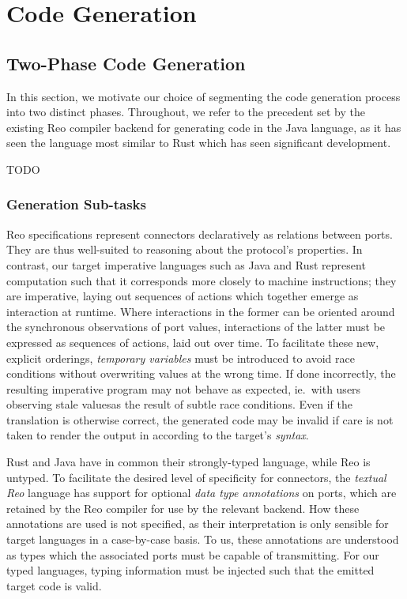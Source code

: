 \chapter{Code Generation}
\label{sec:imperative_form}







\section{Two-Phase Code Generation}
In this section, we motivate our choice of segmenting the code generation process into two distinct phases. Throughout, we refer to the precedent set by the existing Reo compiler backend for generating code in the Java language, as it has seen the language most similar to Rust which has seen significant development.

TODO

\subsection{Generation Sub-tasks}
Reo specifications represent connectors declaratively as relations between ports. They are thus well-suited to reasoning about the protocol's properties. In contrast, our target imperative languages such as Java and Rust represent computation such that it corresponds more closely to machine instructions; they are imperative, laying out sequences of actions which together emerge as interaction at runtime. Where interactions in the former can be oriented around the synchronous observations of port values, interactions of the latter must be expressed as sequences of actions, laid out over time. To facilitate these new, explicit orderings, \textit{temporary variables} must be introduced to avoid race conditions without overwriting values at the wrong time. If done incorrectly, the resulting imperative program may not behave as expected, ie.\ with users observing stale valuesas the result of subtle race conditions. Even if the translation is otherwise correct, the generated code may be invalid if care is not taken to render the output in according to the target's \textit{syntax}. 

Rust and Java have in common their strongly-typed language, while Reo is untyped. To facilitate the desired level of specificity for connectors, the \textit{textual Reo} language has support for optional \textit{data type annotations} on ports, which are retained by the Reo compiler for use by the relevant backend. How these annotations are used is not specified, as their interpretation is only sensible for target languages in a case-by-case basis. To us, these annotations are understood as types which the associated ports must be capable of transmitting. For our typed languages, typing information must be injected such that the emitted target code is valid.

